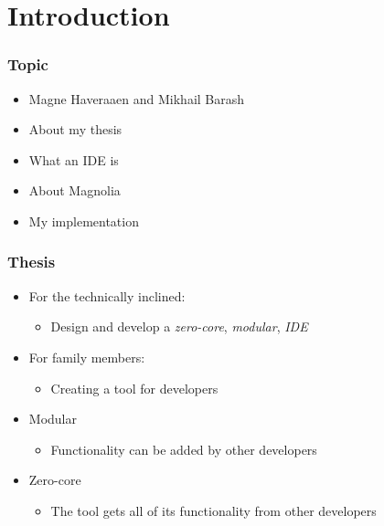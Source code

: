\section{Introduction}
\SectionPage

\begin{frame}
  \frametitle{Topic}
  \begin{itemize}
    \item Magne Haveraaen and Mikhail Barash
      \pause
    \item About my thesis
      \pause
    \item What an IDE is
      \pause
    \item About Magnolia
      \pause
    \item My implementation
  \end{itemize}
\end{frame}

\begin{frame}
  \frametitle{Thesis}
  \begin{itemize}
      \pause
    \item For the technically inclined:
      \begin{itemize}
        \item Design and develop a \textit{zero-core}, \textit{modular}, \textit{IDE} 
      \end{itemize}
      \pause
    \item For family members:
      \pause
      \begin{itemize}
        \item Creating a tool for developers
      \end{itemize}
      \pause
    \item Modular
      \pause
      \begin{itemize}
        \item Functionality can be added by other developers
      \end{itemize}
      \pause
    \item Zero-core
      \pause
      \begin{itemize}
        \item The tool gets all of its functionality from other developers
      \end{itemize}
  \end{itemize}
\end{frame}

